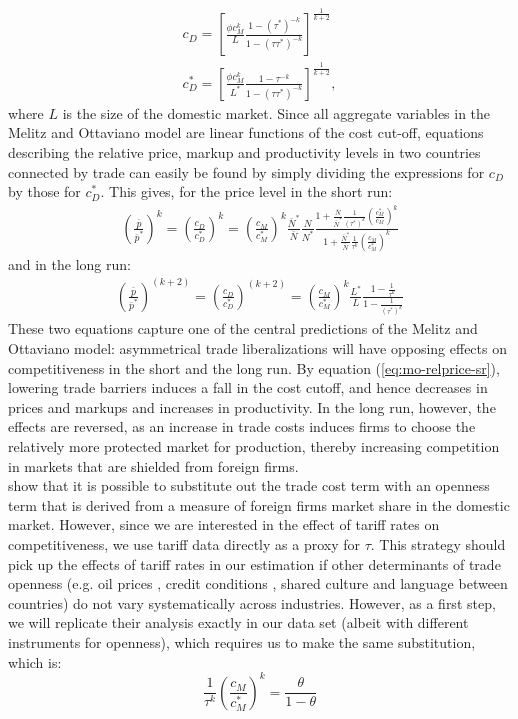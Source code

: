\begin{align}
c_D = \left[ \frac{\phi c_M^k}{L} \frac{1-(\tau^*)^{-k}}{1-(\tau\tau^{*})^{-k}} \right]^{\frac{1}{k+2}} \\
c_D^* = \left[ \frac{\phi c_M^k}{L^*} \frac{1-\tau^{-k}}{1-(\tau\tau^{*})^{-k}} \right]^{\frac{1}{k+2}},
\end{align}
where $L$ is the size of the domestic market. Since all aggregate variables in the Melitz and Ottaviano model are linear functions of the cost cut-off, equations describing the relative price, markup and productivity levels in two countries connected by trade can easily be found by simply dividing the expressions for $c_D$ by those for $c_D^*$. This gives, for the price level in the short run:
\begin{align}
\left( \frac{\bar{p}}{\bar{p}^*} \right)^k = \left( \frac{c_D}{c_D^*} \right)^k = \left(\frac{c_M}{c_M^*} \right)^k \frac{\bar{N}^*}{\bar{N}} \frac{N}{N^*} \frac{1 + \frac{\bar{N}}{\bar{N}^*} \frac{1}{(\tau^*)^k} \left( \frac{c_M^*}{c_M} \right)^k}{1 + \frac{\bar{N}^*}{\bar{N}} \frac{1}{\tau^k} \left( \frac{c_M}{c_M^*} \right)^k} \label{eq:mo-relprice-sr}
\end{align}
and in the long run: 
\begin{align}
\left( \frac{\bar{p}}{\bar{p}^*} \right)^{(k+2)} = \left( \frac{c_D}{c_D^*} \right)^{(k+2)} = \left( \frac{c_M}{c_M^*} \right)^k \frac{L^*}{L} \frac{1-\frac{1}{\tau^k}}{1 - \frac{1}{(\tau^*)^k}} \label{eq:mo-relprice-lr}
\end{align}
These two equations capture one of the central predictions of the Melitz and Ottaviano model: asymmetrical trade liberalizations will have opposing effects on competitiveness in the short and the long run. By equation (\ref{eq:mo-relprice-sr}), lowering trade barriers induces a fall in the cost cutoff, and hence decreases in prices and markups and increases in productivity. In the long run, however, the effects are reversed, as an increase in trade costs induces firms to choose the relatively more protected market for production, thereby increasing competition in markets that are shielded from foreign firms. \\
\citet{Chen2009} show that it is possible to substitute out the trade cost term with an openness term that is derived from a measure of foreign firms market share in the domestic market. However, since we are interested in the effect of tariff rates on competitiveness, we use tariff data directly as a proxy for $\tau$. This strategy should pick up the effects of tariff rates in our estimation if other determinants of trade openness (e.g. oil prices \citep{Kilian2009}, credit conditions \citep{Chor2012}, shared culture and language between countries) do not vary systematically across industries. However, as a first step, we will replicate their analysis exactly in our data set (albeit with different instruments for openness), which requires us to make the same substitution, which is:
\begin{equation}
\frac{1}{\tau^k} \left( \frac{c_M}{c_M^*} \right)^k = \frac{\theta}{1-\theta} 
\end{equation}

